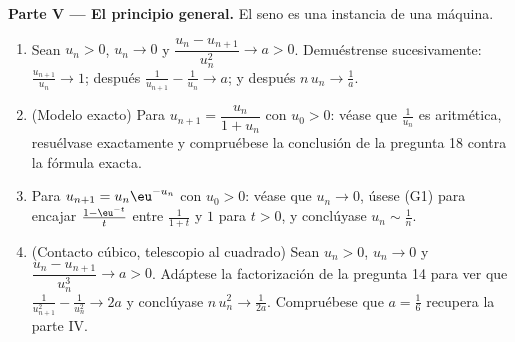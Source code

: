 \begin{problem}[{Problema del fin de semana --- el teorema de
Cesàro--Stolz y la asintótica $u_n \sim \sqrt{3/n}$ para
$u_{n+1} = \sin u_n$}]
\medskip
\noindent\textbf{Parte V --- El principio general.} El seno es una
instancia de una máquina.
\begin{enumerate}[resume]
  \item Sean $u_n > 0$, $u_n \to 0$ y $\dfrac{u_n -
        u_{n+1}}{u_n^{2}} \to a > 0$. Demuéstrense sucesivamente:
        $\frac{u_{n+1}}{u_n} \to 1$; después $\frac{1}{u_{n+1}} -
        \frac{1}{u_n} \to a$; y después $n\,u_n \to \frac1a$.
  \item (Modelo exacto) Para $u_{n+1} = \dfrac{u_n}{1 + u_n}$ con
        $u_0 > 0$: véase que $\frac{1}{u_n}$ es aritmética, resuélvase
        exactamente y compruébese la conclusión de la pregunta 18
        contra la fórmula exacta.
  \item Para $u_{n+1} = u_n \eu^{-u_n}$ con $u_0 > 0$: véase que
        $u_n \to 0$, úsese (G1) para encajar
        $\frac{1 - \eu^{-t}}{t}$ entre $\frac{1}{1+t}$ y $1$ para
        $t > 0$, y conclúyase $u_n \sim \frac 1n$.
  \item (Contacto cúbico, telescopio al cuadrado) Sean $u_n > 0$,
        $u_n \to 0$ y $\dfrac{u_n - u_{n+1}}{u_n^{3}} \to a > 0$.
        Adáptese la factorización de la pregunta 14 para ver que
        $\frac{1}{u_{n+1}^2} - \frac{1}{u_n^2} \to 2a$ y conclúyase
        $n\,u_n^{2} \to \frac{1}{2a}$. Compruébese que $a = \frac16$
        recupera la parte IV.
\end{enumerate}


\end{problem}
